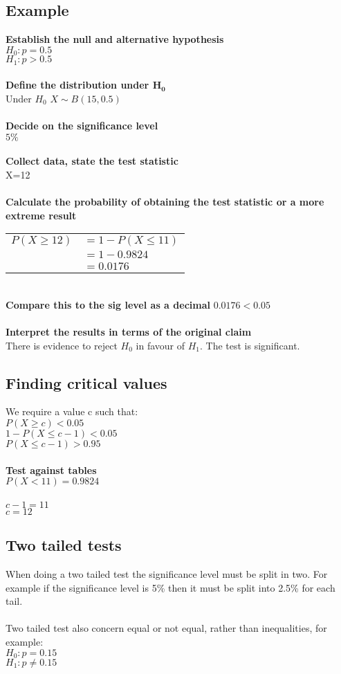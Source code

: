 \documentclass{article}[18pt]
\begin{document}
\subsection{Example}
\textbf{Establish the null and alternative hypothesis}\\
$H_0:p=0.5$\\
$H_1:p>0.5$\\
\\
\textbf{Define the distribution under $\mathbf{H_0}$}\\
Under $H_0$ $X\sim B(15,0.5)$\\
\\
\textbf{Decide on the significance level}\\
$5\%$\\
\\
\textbf{Collect data, state the test statistic}\\
X=12\\
\\
\textbf{Calculate the probability of obtaining the test statistic or a more extreme result}\\
\begin{tabular}{r l}
$P(X\geqslant 12)$&$=1-P(X\leqslant 11)$\\
&$=1-0.9824$\\
&$=0.0176$\\
\end{tabular}
\\
\textbf{Compare this to the sig level as a decimal}
$0.0176<0.05$\\
\\
\textbf{Interpret the results in terms of the original claim}\\
There is evidence to reject $H_0$ in favour of $H_1$. The test is significant.
\subsection{Finding critical values}
We require a value c such that:\\
$P(X\geqslant c)<0.05$\\
$1-P(X\leqslant c-1)<0.05$\\
$P(X\leqslant c-1)>0.95$\\
\\
\textbf{Test against tables}\\
$P(X<11)=0.9824$\\
\\
$c-1=11$\\
$c=12$
\subsection{Two tailed tests}
When doing a two tailed test the significance level must be split in two. For example if the significance level is 5\% then it must be split into 2.5\% for each tail.\\
\\
Two tailed test also concern equal or not equal, rather than inequalities, for example:\\
$H_0 : p=0.15$\\
$H_1 : p\neq0.15$
\end{document}
